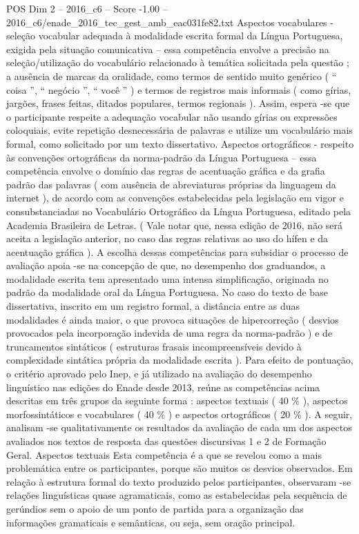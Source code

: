 \begin{textsample}{POS Dim 2 – 2016\_c6 – Score -1.00 – 2016\_c6/enade\_2016\_tec\_gest\_amb\_eac031fe82.txt}
Aspectos vocabulares - seleção vocabular adequada à modalidade escrita formal da Língua Portuguesa, exigida pela situação comunicativa – essa competência envolve a precisão na seleção/utilização do vocabulário relacionado à temática solicitada pela questão ; a ausência de marcas da oralidade, como termos de sentido muito genérico ( “ coisa ”, “ negócio ”, “ você ” ) e termos de registros mais informais ( como gírias, jargões, frases feitas, ditados populares, termos regionais ).
Assim, espera -se que o participante respeite a adequação vocabular não usando gírias ou expressões coloquiais, evite repetição desnecessária de palavras e utilize um vocabulário mais formal, como solicitado por um texto dissertativo.
Aspectos ortográficos - respeito às convenções ortográficas da norma-padrão da Língua Portuguesa – essa competência envolve o domínio das regras de acentuação gráfica e da grafia padrão das palavras ( com ausência de abreviaturas próprias da linguagem da internet ), de acordo com as convenções estabelecidas pela legislação em vigor e consubstanciadas no Vocabulário Ortográfico da Língua Portuguesa, editado pela Academia Brasileira de Letras. ( Vale notar que, nessa edição de 2016, não será aceita a legislação anterior, no caso das regras relativas ao uso do hífen e da acentuação gráfica ).
A escolha dessas competências para subsidiar o processo de avaliação apoia -se na concepção de que, no desempenho dos graduandos, a modalidade escrita tem apresentado uma intensa simplificação, originada no padrão da modalidade oral da Língua Portuguesa.
No caso do texto de base dissertativa, inscrito em um registro formal, a distância entre as duas modalidades é ainda maior, o que provoca situações de hipercorreção ( desvios provocados pela incorporação indevida de uma regra da norma-padrão ) e de truncamentos sintáticos ( estruturas frasais incompreensíveis devido à complexidade sintática própria da modalidade escrita ).
Para efeito de pontuação, o critério aprovado pelo Inep, e já utilizado na avaliação do desempenho linguístico nas edições do Enade desde 2013, reúne as competências acima descritas em três grupos da seguinte forma : aspectos textuais ( 40 \% ), aspectos morfossintáticos e vocabulares ( 40 \% ) e aspectos ortográficos ( 20 \% ).
A seguir, analisam -se qualitativamente os resultados da avaliação de cada um dos aspectos avaliados nos textos de resposta das questões discursivas 1 e 2 de Formação Geral.
Aspectos textuais Esta competência é a que se revelou como a mais problemática entre os participantes, porque são muitos os desvios observados.
Em relação à estrutura formal do texto produzido pelos participantes, observaram -se relações linguísticas quase agramaticais, como as estabelecidas pela sequência de gerúndios sem o apoio de um ponto de partida para a organização das informações gramaticais e semânticas, ou seja, sem oração principal.

\end{textsample}
